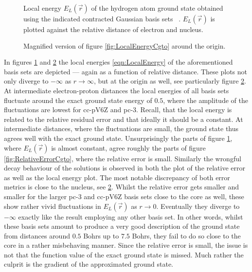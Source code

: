 \begin{figure}[p]
	\centering
	\caption[Local energy of the hydrogen \HF ground state]{
		Local energy $E_L(\vec{r})$ of the hydrogen atom \HF ground state
		obtained using the indicated contracted Gaussian basis sets%
		~\cite{Hehre1969,Dunning1989,Jensen2001,Wilson1996}.
		$E_L(\vec{r})$ is plotted against the relative distance
		of electron and nucleus.
	}
	\label{fig:LocalEnergyCgto}
\end{figure}

\begin{figure}[p]
	\centering
	\caption[Local energy of the hydrogen \HF ground state (magnified)]{
		Magnified version of figure \vref{fig:LocalEnergyCgto}
		around the origin.
	}
	\label{fig:LocalEnergyCgtoZoom}
\end{figure}

In figures \ref{fig:LocalEnergyCgto} and \ref{fig:LocalEnergyCgtoZoom}
the local energies \eqref{eqn:LocalEnergy}
of the aforementioned basis sets are depicted
--- again as a function of relative distance.
These plots not only diverge to $-\infty$ as $r \to \infty$,
but at the origin as well, see particularly figure \ref{fig:LocalEnergyCgtoZoom}.
At intermediate electron-proton distances
the local energies of all basis sets
fluctuate around the exact ground state energy of $0.5$,
where the amplitude of the fluctuations are lowest for cc-pV6Z and pc-3.
Recall, that the local energy is related to the relative residual error
and that ideally it should be a constant.
At intermediate distances, where the fluctuations are small,
the \HF ground state thus agrees well with the exact ground state.
Unsurprisingly the parts of figure \ref{fig:LocalEnergyCgto},
where $E_L(\vec{r})$ is almost constant,
agree roughly the parts of figure \ref{fig:RelativeErrorCgto},
where the relative error is small.
Similarly the wrongful decay behaviour of the \cGTO solutions
is observed in both the plot of the relative error as well as
the local energy plot.
The most notable discrepancy of both error metrics
is close to the nucleus, see \ref{fig:LocalEnergyCgtoZoom}.
Whilst the relative error gets smaller and smaller for the larger
pc-3 and cc-pV6Z basis sets close to the core as well,
these show rather vivid fluctuations in $E_L(\vec{r})$ as $r \to 0$.
Eventually they diverge to $-\infty$ exactly like the result
employing any other basis set.
In other words, whilst these basis sets amount to produce
a very good description of the ground state from distances around
$0.5$ Bohrs up to $7.5$ Bohrs,
they fail to do so close to the core in a rather misbehaving manner.
Since the relative error is small,
the issue is not that the function value
of the exact ground state is missed.
Much rather the culprit is the gradient of the approximated
\HF ground state.

